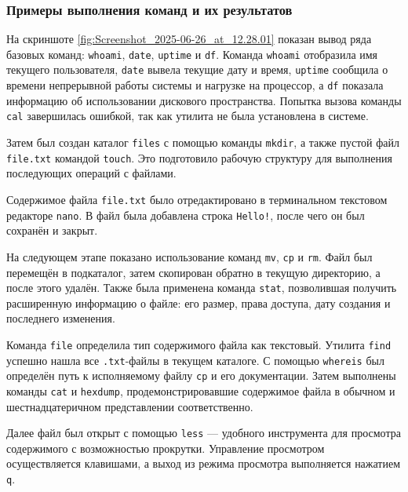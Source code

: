 \subsubsection*{Примеры выполнения команд и их результатов}

На скриншоте \ref{fig:Screenshot_2025-06-26_at_12.28.01} показан вывод ряда базовых команд: \texttt{whoami}, \texttt{date}, \texttt{uptime} и \texttt{df}. Команда \texttt{whoami} отобразила имя текущего пользователя, \texttt{date} вывела текущие дату и время, \texttt{uptime} сообщила о времени непрерывной работы системы и нагрузке на процессор, а \texttt{df} показала информацию об использовании дискового пространства. Попытка вызова команды \texttt{cal} завершилась ошибкой, так как утилита не была установлена в системе.

Затем был создан каталог \texttt{files} с помощью команды \texttt{mkdir}, а также пустой файл \texttt{file.txt} командой \texttt{touch}. Это подготовило рабочую структуру для выполнения последующих операций с файлами.

Содержимое файла \texttt{file.txt} было отредактировано в терминальном текстовом редакторе \texttt{nano}. В файл была добавлена строка \texttt{Hello!}, после чего он был сохранён и закрыт.

На следующем этапе показано использование команд \texttt{mv}, \texttt{cp} и \texttt{rm}. Файл был перемещён в подкаталог, затем скопирован обратно в текущую директорию, а после этого удалён. Также была применена команда \texttt{stat}, позволившая получить расширенную информацию о файле: его размер, права доступа, дату создания и последнего изменения.

Команда \texttt{file} определила тип содержимого файла как текстовый. Утилита \texttt{find} успешно нашла все \texttt{.txt}-файлы в текущем каталоге. С помощью \texttt{whereis} был определён путь к исполняемому файлу \texttt{cp} и его документации. Затем выполнены команды \texttt{cat} и \texttt{hexdump}, продемонстрировавшие содержимое файла в обычном и шестнадцатеричном представлении соответственно.

Далее файл был открыт с помощью \texttt{less} — удобного инструмента для просмотра содержимого с возможностью прокрутки. Управление просмотром осуществляется клавишами, а выход из режима просмотра выполняется нажатием \texttt{q}.

